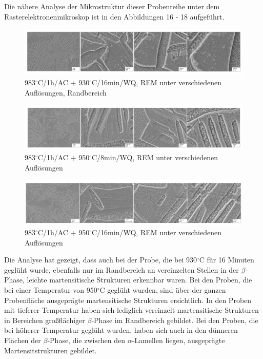 Die nähere Analyse der Mikrostruktur dieser Probenreihe unter dem Rasterelektronenmikroskop ist in den Abbildungen 16 - 18 aufgeführt.

\begin{figure}[!]
	\centering
	\includegraphics[width=0.9\linewidth]{"Bilder/Abbildung 16"}
	\caption[Abbildung 16]{983$^\circ$C/1h/AC + 930$^\circ$C/16min/WQ, REM unter verschiedenen Auflösungen, Randbereich}
	\label{fig:abbildung-16}
\end{figure}

\begin{figure}[!]
	\centering
	\includegraphics[width=0.9\linewidth]{"Bilder/Abbildung 17"}
	\caption[Abbildung 17]{983$^\circ$C/1h/AC + 950$^\circ$C/8min/WQ, REM unter verschiedenen Auflösungen}
	\label{fig:abbildung-17}
\end{figure}

\begin{figure}[!]
	\centering
	\includegraphics[width=0.9\linewidth]{"Bilder/Abbildung 18"}
	\caption[Abbildung 18]{983$^\circ$C/1h/AC + 950$^\circ$C/16min/WQ, REM unter verschiedenen Auflösungen}
	\label{fig:abbildung-18}
\end{figure}

\pagebreak

Die Analyse hat gezeigt, dass auch bei der Probe, die bei 930$^\circ$C für 16 Minuten geglüht wurde, ebenfalls nur im Randbereich an vereinzelten Stellen in der $\beta$-Phase, leichte martensitische Strukturen erkennbar waren.
Bei den Proben, die bei einer Temperatur von 950$^\circ$C geglüht wurden, sind über der ganzen Probenfläche ausgeprägte martensitische Strukturen ersichtlich. In den Proben mit tieferer Temperatur haben sich lediglich vereinzelt martensitische Strukturen in Bereichen großflächiger $\beta$-Phase im Randbereich gebildet. Bei den Proben, die bei höherer Temperatur geglüht wurden, haben sich auch in den dünneren Flächen der $\beta$-Phase, die zwischen den $\alpha$-Lamellen liegen, ausgeprägte Martensitstrukturen gebildet.

